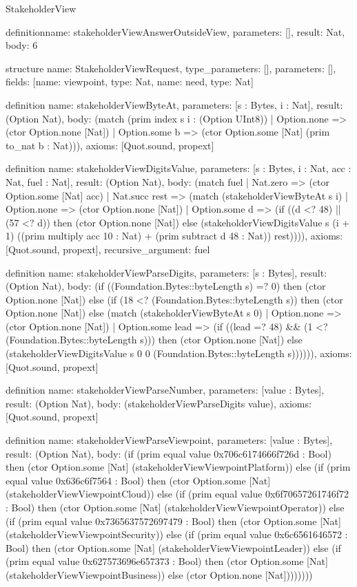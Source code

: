 \begin{lexlean}{StakeholderView}
\begin{semanticmodule}
definition{name: stakeholderViewAnswerOutsideView, parameters: [], result: Nat, body: 6}

structure{
  name: StakeholderViewRequest,
  type_parameters: [],
  parameters: [],
  fields: [{name: viewpoint, type: Nat}, {name: need, type: Nat}]
}

definition{
  name: stakeholderViewByteAt,
  parameters: [s : Bytes, i : Nat],
  result: (Option Nat),
  body: (match (prim index s i : (Option UInt8))
    | Option.none => (ctor Option.none [Nat])
    | Option.some b => (ctor Option.some [Nat] (prim to_nat b : Nat))),
  axioms: [Quot.sound, propext]
}

definition{
  name: stakeholderViewDigitsValue,
  parameters: [s : Bytes, i : Nat, acc : Nat, fuel : Nat],
  result: (Option Nat),
  body: (match fuel
    | Nat.zero => (ctor Option.some [Nat] acc)
    | Nat.succ rest => (match (stakeholderViewByteAt s i)
      | Option.none => (ctor Option.none [Nat])
      | Option.some d => (if ((d <? 48) || (57 <? d)) then (ctor Option.none [Nat]) else (stakeholderViewDigitsValue s (i + 1) ((prim multiply acc 10 : Nat) + (prim subtract d 48 : Nat)) rest)))),
  axioms: [Quot.sound, propext],
  recursive_argument: fuel
}

definition{
  name: stakeholderViewParseDigits,
  parameters: [s : Bytes],
  result: (Option Nat),
  body: (if ((Foundation.Bytes::byteLength s) =? 0) then (ctor Option.none [Nat]) else (if (18 <? (Foundation.Bytes::byteLength s)) then (ctor Option.none [Nat]) else (match (stakeholderViewByteAt s 0)
    | Option.none => (ctor Option.none [Nat])
    | Option.some lead => (if ((lead =? 48) && (1 <? (Foundation.Bytes::byteLength s))) then (ctor Option.none [Nat]) else (stakeholderViewDigitsValue s 0 0 (Foundation.Bytes::byteLength s)))))),
  axioms: [Quot.sound, propext]
}

definition{
  name: stakeholderViewParseNumber,
  parameters: [value : Bytes],
  result: (Option Nat),
  body: (stakeholderViewParseDigits value),
  axioms: [Quot.sound, propext]
}

definition{
  name: stakeholderViewParseViewpoint,
  parameters: [value : Bytes],
  result: (Option Nat),
  body: (if (prim equal value 0x706c6174666f726d : Bool) then (ctor Option.some [Nat] (stakeholderViewViewpointPlatform)) else (if (prim equal value 0x636c6f7564 : Bool) then (ctor Option.some [Nat] (stakeholderViewViewpointCloud)) else (if (prim equal value 0x6f70657261746f72 : Bool) then (ctor Option.some [Nat] (stakeholderViewViewpointOperator)) else (if (prim equal value 0x7365637572697479 : Bool) then (ctor Option.some [Nat] (stakeholderViewViewpointSecurity)) else (if (prim equal value 0x6c6561646572 : Bool) then (ctor Option.some [Nat] (stakeholderViewViewpointLeader)) else (if (prim equal value 0x627573696e657373 : Bool) then (ctor Option.some [Nat] (stakeholderViewViewpointBusiness)) else (ctor Option.none [Nat])))))))
}


\end{semanticmodule}
\end{lexlean}
